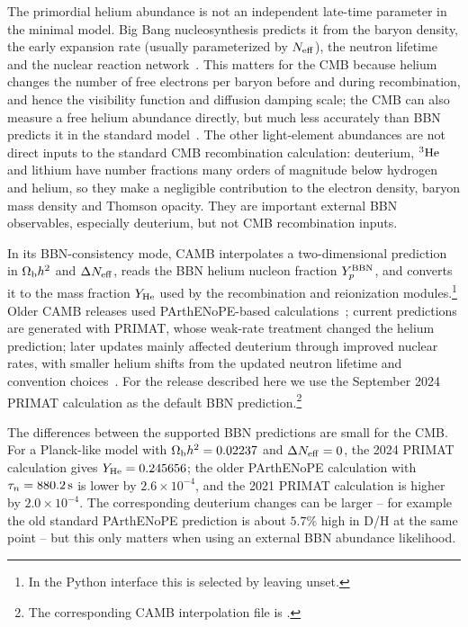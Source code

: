 \documentclass[prd, twocolumn, superscriptaddress, tightenlines, longbibliography, nofootinbib, eqsecnum, amsfonts, amsmath, floatfix, notitlepage]{revtex4-2}
\newcommand{\code}[1]{\texttt{\detokenize{#1}}}
\begin{document}
The primordial helium abundance is not an independent late-time parameter in the
minimal model. Big Bang nucleosynthesis predicts it from the baryon density, the
early expansion rate (usually parameterized by \(N_{\rm eff}\)), the neutron
lifetime and the nuclear reaction network~\cite{Hamann:2007sb,Pisanti:2007hk,
Consiglio:2017pot,Pitrou:2018cgg}. This matters for the CMB because helium
changes the number of free electrons per baryon before and during recombination,
and hence the visibility function and diffusion damping scale; the CMB can also
measure a free helium abundance directly, but much less accurately than BBN
predicts it in the standard model~\cite{Trotta:2003xg,PCP2018}. The other
light-element abundances are not direct inputs to the standard CMB recombination
calculation: deuterium, \(^{3}{\rm He}\) and lithium have number fractions many
orders of magnitude below hydrogen and helium, so they make a negligible
contribution to the electron density, baryon mass density and Thomson opacity.
They are important external BBN observables, especially deuterium, but not CMB
recombination inputs.

In its BBN-consistency mode, \textsc{CAMB} interpolates a two-dimensional
prediction in \(\Omega_{\rm b}h^2\) and \(\Delta N_{\rm eff}\), reads the BBN
helium nucleon fraction \(Y_p^{\rm BBN}\), and converts it to the mass fraction
\(Y_{\rm He}\) used by the recombination and reionization modules.\footnote{In
the Python interface this is selected by leaving \code{YHe} unset.} Older
\textsc{CAMB} releases used PArthENoPE-based calculations~\cite{Pisanti:2007hk,
Consiglio:2017pot}; current predictions are generated with \textsc{PRIMAT}, whose
weak-rate treatment changed the helium prediction; later updates mainly affected
deuterium through improved nuclear rates, with smaller helium shifts from the
updated neutron lifetime and convention choices~\cite{Pitrou:2018cgg,
Pitrou:2020etk}. For the release described here we use the September 2024
\textsc{PRIMAT} calculation as the default BBN prediction.\footnote{The
corresponding \textsc{CAMB} interpolation file is
\code{PRIMAT_Yp_DH_ErrorMC_2024.dat}.}

The differences between the supported BBN predictions are small for the CMB. For a
Planck-like model with \(\Omega_{\rm b}h^2=0.02237\) and
\(\Delta N_{\rm eff}=0\), the 2024 \textsc{PRIMAT} calculation gives
\(Y_{\rm He}=0.245656\); the older PArthENoPE calculation with
\(\tau_n=880.2\,{\rm s}\) is lower by \(2.6\times10^{-4}\), and the 2021
\textsc{PRIMAT} calculation is higher by \(2.0\times10^{-4}\).
The corresponding deuterium changes
can be larger -- for example the old standard PArthENoPE prediction is about \(5.7\%\)
high in D/H at the same point -- but this only matters when using an external BBN
abundance likelihood.
\end{document}
